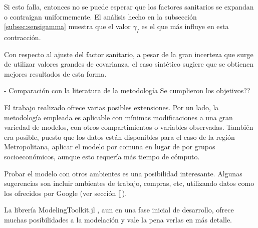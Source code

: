 Si esto falla, entonces no se puede esperar que los factores sanitarios se expandan o contraigan uniformemente. El análisis hecho en la subsección \ref{subsec:sensigamma} muestra que el valor \(\gamma_I\) es el que más influye en esta contracción.

Con respecto al ajuste del factor sanitario, a pesar de la gran incerteza que surge de utilizar valores grandes de covarianza, el caso sintético sugiere que se obtienen mejores resultados de esta forma.

- Comparación con la literatura de la metodología 
Se cumplieron los objetivos??



El trabajo realizado ofrece varias posibles extensiones. Por un lado, la metodología empleada es aplicable con mínimas modificaciones a una gran variedad de modelos, con otros compartimientos o variables observadas. También era posible, puesto que los datos están disponibles para el caso de la región Metropolitana, aplicar el modelo por comuna en lugar de por grupos socioeconómicos, aunque esto requería más tiempo de cómputo. 

Probar el modelo con otros ambientes es una posibilidad interesante. Algunas sugerencias son incluir ambientes de trabajo, compras, etc, utilizando datos como los ofrecidos por Google (ver sección \ref{}).

La librería ModelingToolkit.jl \cite{}, aun en una fase inicial de desarrollo, ofrece muchas posibilidades a la modelación y vale la pena verlas en más detalle.